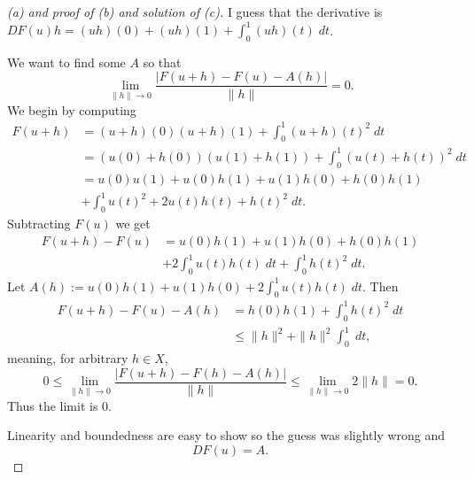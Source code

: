 \begin{proof}[(a) and proof of (b) and solution of (c)]
    I guess that the derivative is $DF(u)h = (uh)(0) + (uh)(1) 
    + \int_0^1 (uh)(t) \; dt$.

    We want to find some $A$ so that 
    \[
        \lim_{\|h\|\to0} \frac{|F(u + h) - F(u) - A(h)|}{\|h\|} 
        = 0.
    \]
    We begin by computing 
    \begin{align*}
        F(u+h) 
        &= (u+h)(0)(u+h)(1) + \int_0^1 (u+h)(t)^2 \; dt \\ 
        &= (u(0) + h(0))(u(1) + h(1)) 
        + \int_0^1 (u(t) + h(t))^2 \; dt \\ 
        &= u(0)u(1) + u(0)h(1) + u(1)h(0) + h(0)h(1) 
        \\ 
        &+ \int_0^1 u(t)^2 + 2u(t)h(t) + h(t)^2 \; dt.
    \end{align*}
    Subtracting $F(u)$ we get 
    \begin{align*}
        F(u+h) - F(u) 
        &= u(0)h(1) + u(1)h(0) + h(0)h(1) 
        \\
        &+ 2\int_0^1 u(t)h(t) \; dt + \int_0^1 h(t)^2 \; dt. 
    \end{align*}
    Let $A(h) := u(0)h(1) + u(1)h(0) + 2\int_0^1 u(t)h(t) \; dt$. 
    Then 
    \begin{align*}
        F(u+h) - F(u) - A(h)  
        &= h(0)h(1) + \int_0^1 h(t)^2 \;dt \\ 
        &\leq \|h\|^2 + \|h\|^2 \int_0^1 \; dt, 
    \end{align*}
    meaning, for arbitrary $h \in X$, 
    \[
        0 \leq \lim_{\|h\|\to 0}\frac{|F(u+h)- F(h) - A(h)|}{\|h\|} 
        \leq \lim_{\|h\|\to 0} 2\|h\| = 0.
    \]
    Thus the limit is $0$.  
    
    Linearity and boundedness are easy to show so the guess 
    was slightly wrong and 
    \[
        DF(u) = A.
    \]
\end{proof}

